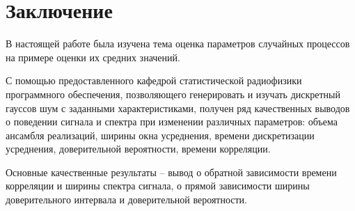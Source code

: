 \documentclass[a4paper,14pt]{extarticle}
\begin{document}
\section*{Заключение}

В настоящей работе была изучена тема оценка параметров случайных процессов на примере оценки их средних значений. 

С помощью предоставленного кафедрой статистической радиофизики программного обеспечения, позволяющего генерировать и изучать  дискретный гауссов шум с заданными характеристиками, получен ряд качественных выводов о поведении сигнала и спектра при изменении различных параметров: объема ансамбля реализаций, ширины окна усреднения, времени дискретизации усреднения, доверительной вероятности, времени корреляции.

Основные качественные результаты -- вывод о обратной зависимости времени корреляции и ширины спектра сигнала, о прямой зависимости ширины доверительного интервала и доверительной вероятности. 
\end{document}
